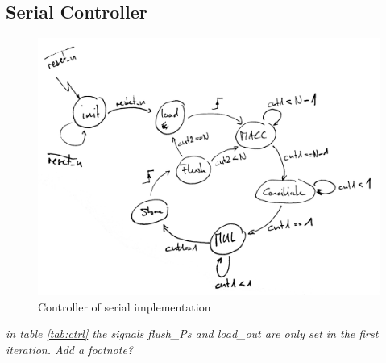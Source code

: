 \documentclass[mscthesis]{usiinfthesis}
\begin{document}
\subsection{Serial Controller}

\begin{figure}[h]
    \includegraphics[width=1\columnwidth]{arch_ctrl.png}
    \caption{Controller of serial implementation}
    \label{fig:ctrl}
\end{figure}

\emph{\color{red} in table \ref{tab:ctrl} the signals flush\_Ps and load\_out
are only set in the first iteration. Add a footnote?}
\end{document}
